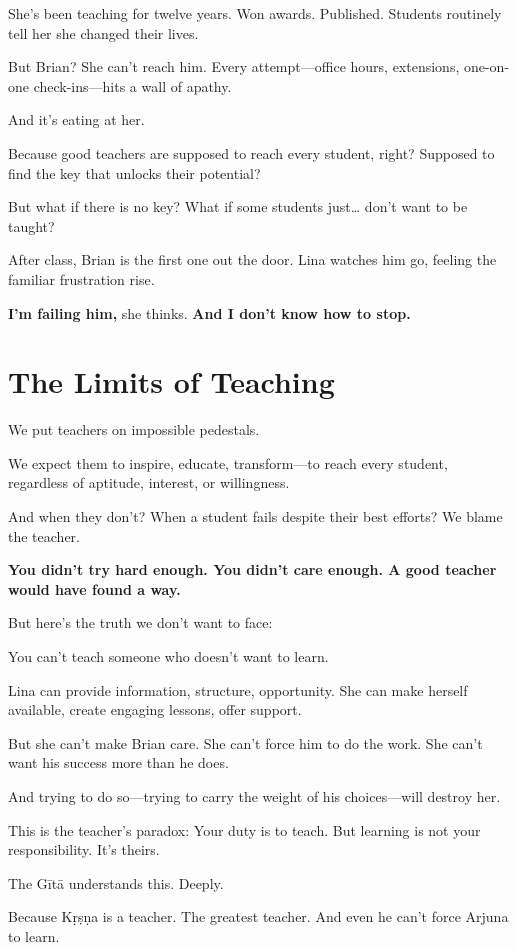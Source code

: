 \documentclass[11pt,twoside]{book}
\begin{document}
She's been teaching for twelve years. Won awards. Published. Students routinely tell her she changed their lives.

But Brian? She can't reach him. Every attempt—office hours, extensions, one-on-one check-ins—hits a wall of apathy.

And it's eating at her.

Because good teachers are supposed to reach every student, right? Supposed to find the key that unlocks their potential?

But what if there is no key? What if some students just\ldots{} don't want to be taught?

After class, Brian is the first one out the door. Lina watches him go, feeling the familiar frustration rise.

\textbf{I'm failing him,} she thinks. \textbf{And I don't know how to stop.}

\section*{The Limits of Teaching}

We put teachers on impossible pedestals.

We expect them to inspire, educate, transform—to reach every student, regardless of aptitude, interest, or willingness.

And when they don't? When a student fails despite their best efforts? We blame the teacher.

\textbf{You didn't try hard enough. You didn't care enough. A good teacher would have found a way.}

But here's the truth we don't want to face:

You can't teach someone who doesn't want to learn.

Lina can provide information, structure, opportunity. She can make herself available, create engaging lessons, offer support.

But she can't make Brian care. She can't force him to do the work. She can't want his success more than he does.

And trying to do so—trying to carry the weight of his choices—will destroy her.

This is the teacher's paradox: Your duty is to teach. But learning is not your responsibility. It's theirs.

The Gītā understands this. Deeply.

Because Kṛṣṇa is a teacher. The greatest teacher. And even he can't force Arjuna to learn.
\end{document}
